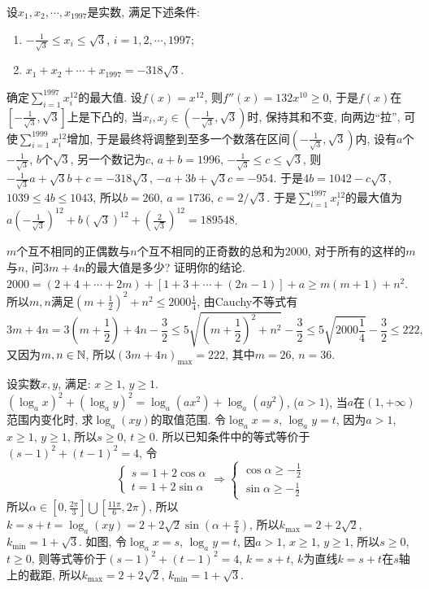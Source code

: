 \bq{}{}
设$x_{1},x_{2},\cdots,x_{1997}$是实数, 满足下述条件:
\begin{enumerate}
\item $-\frac{1}{\sqrt{3}}\le x_{i}\le\sqrt{3}$, $i=1,2,\cdots,1997$;
\item $x_{1}+x_{2}+\cdots+x_{1997}=-318\sqrt{3}$.
\end{enumerate}
确定$\sum_{i=1}^{1997}x_{i}^{12}$的最大值.
\eq
\ba
设$f(x)=x^{12}$, 则$f''(x)=132x^{10}\ge0$, 于是$f(x)$在$\left[-\frac{1}{\sqrt{3}},\sqrt{3}\right]$上是下凸的,
当$x_{i},x_{j}\in\left(-\frac{1}{\sqrt{3}},\sqrt{3}\right)$时, 保持其和不变,
向两边``拉'', 可使$\sum_{i=1}^{1999}x_{i}^{12}$增加, 于是最终将调整到至多一个数落在区间$\left(-\frac{1}{\sqrt{3}},\sqrt{3}\right)$内,
设有$a$个$-\frac{1}{\sqrt{3}}$, $b$个$\sqrt{3}$, 另一个数记为$c$, $a+b=1996$,
$-\frac{1}{\sqrt{3}}\le c\le\sqrt{3}$, 则$-\frac{1}{\sqrt{3}}a+\sqrt{3}b+c=-318\sqrt{3}$,
$-a+3b+\sqrt{3}c=-954$. 于是$4b=1042-c\sqrt{3}$, $1039\le4b\le1043$,
所以$b=260$, $a=1736$, $c=2/\sqrt{3}$. 于是$\sum_{i=1}^{1997}x_{i}^{12}$的最大值为$a\left(-\frac{1}{\sqrt{3}}\right)^{12}+b\left(\sqrt{3}\right)^{12}+\left(\frac{2}{\sqrt{3}}\right)^{12}=189548$.
\ea

\bq{}{}
$m$个互不相同的正偶数与$n$个互不相同的正奇数的总和为$2000$, 对于所有的这样的$m$与$n$, 问$3m+4n$的最大值是多少?
证明你的结论.
\eq
\ba
$2000=\left(2+4+\cdots+2m\right)+\left[1+3+\cdots+\left(2n-1\right)\right]+a\ge m\left(m+1\right)+n^{2}$.
所以$m,n$满足$\left(m+\frac{1}{2}\right)^{2}+n^{2}\le2000\frac{1}{4}$,
由Cauchy不等式有
\[
3m+4n=3\left(m+\frac{1}{2}\right)+4n-\frac{3}{2}\le5\sqrt{\left(m+\frac{1}{2}\right)^{2}+n^{2}}-\frac{3}{2}\le5\sqrt{2000\frac{1}{4}}-\frac{3}{2}\le222,
\]
又因为$m,n\in\mathbb{N}$, 所以$\left(3m+4n\right)_{\mathrm{max}}=222$, 其中$m=26$,
$n=36$.
\ea

\bq{}{}
设实数$x,y$, 满足: $x\ge1$, $y\ge1$. $\left(\log_{a}x\right)^{2}+\left(\log_{a}y\right)^{2}=\log_{a}\left(ax^{2}\right)+\log_{a}\left(ay^{2}\right)$,
($a>1$), 当$a$在$\left(1,+\infty\right)$范围内变化时, 求$\log_{a}\left(xy\right)$的取值范围.
\eq
\ba
令$\log_{a}x=s$, $\log_{a}y=t$, 因为$a>1$, $x\ge1$, $y\ge1$,
所以$s\ge0$, $t\ge0$. 所以已知条件中的等式等价于$\left(s-1\right)^{2}+\left(t-1\right)^{2}=4$,
令
\[
\begin{cases}
s =1+2\cos\alpha\\
t =1+2\sin\alpha
\end{cases}\Longrightarrow\begin{cases}
\cos\alpha \ge-\frac{1}{2}\\
\sin\alpha \ge-\frac{1}{2}
\end{cases}
\]
所以$\alpha\in\left[0,\frac{2\pi}{3}\right]\bigcup\left[\frac{11\pi}{6},2\pi\right)$,
所以$k=s+t=\log_{a}\left(xy\right)=2+2\sqrt{2}\sin\left(\alpha+\frac{\pi}{4}\right)$,
所以$k_{\mathrm{max}}=2+2\sqrt{2}$, $k_{\mathrm{min}}=1+\sqrt{3}$.
\ea
\ba
如图, 令$\log_{a}x=s$, $\log_{a}y=t$, 因$a>1$, $x\ge1$, $y\ge1$,
所以$s\ge0$, $t\ge0$, 则等式等价于$\left(s-1\right)^{2}+\left(t-1\right)^{2}=4$,
$k=s+t$, $k$为直线$k=s+t$在$s$轴上的截距, 所以$k_{\mathrm{max}}=2+2\sqrt{2}$,
$k_{\mathrm{min}}=1+\sqrt{3}$.

